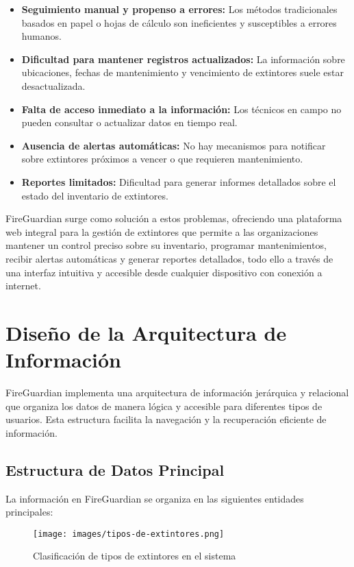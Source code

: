 \documentclass[11pt,a4paper]{article}
\begin{document}
\begin{itemize}
    \item \textbf{Seguimiento manual y propenso a errores:} Los métodos tradicionales basados en papel o hojas de cálculo son ineficientes y susceptibles a errores humanos.
    \item \textbf{Dificultad para mantener registros actualizados:} La información sobre ubicaciones, fechas de mantenimiento y vencimiento de extintores suele estar desactualizada.
    \item \textbf{Falta de acceso inmediato a la información:} Los técnicos en campo no pueden consultar o actualizar datos en tiempo real.
    \item \textbf{Ausencia de alertas automáticas:} No hay mecanismos para notificar sobre extintores próximos a vencer o que requieren mantenimiento.
    \item \textbf{Reportes limitados:} Dificultad para generar informes detallados sobre el estado del inventario de extintores.
\end{itemize}

FireGuardian surge como solución a estos problemas, ofreciendo una plataforma web integral para la gestión de extintores que permite a las organizaciones mantener un control preciso sobre su inventario, programar mantenimientos, recibir alertas automáticas y generar reportes detallados, todo ello a través de una interfaz intuitiva y accesible desde cualquier dispositivo con conexión a internet.

\section{Diseño de la Arquitectura de Información}

FireGuardian implementa una arquitectura de información jerárquica y relacional que organiza los datos de manera lógica y accesible para diferentes tipos de usuarios. Esta estructura facilita la navegación y la recuperación eficiente de información.

\subsection{Estructura de Datos Principal}

La información en FireGuardian se organiza en las siguientes entidades principales:

\begin{figure}[h]
    \centering
    \texttt{[image: images/tipos-de-extintores.png]}
    \caption{Clasificación de tipos de extintores en el sistema}
    \label{fig:tipos-extintores}
\end{figure}
\end{document}
